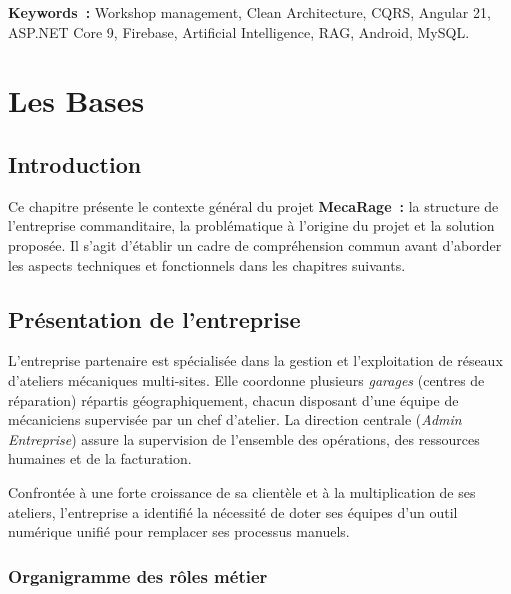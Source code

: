 \documentclass[12pt,a4paper]{report}
\begin{document}
\bigskip
\noindent\textbf{Keywords~:} Workshop management, Clean Architecture, CQRS,
Angular 21, ASP.NET Core 9, Firebase, Artificial Intelligence, RAG, Android, MySQL.

\tableofcontents
\listoffigures
\listoftables

\cleardoublepage
{}
\setcounter{page}{1}

\chapter{Les Bases}

\section{Introduction}

Ce chapitre présente le contexte général du projet \textbf{MecaRage~:} la structure
de l'entreprise commanditaire, la problématique à l'origine du projet et la solution
proposée. Il s'agit d'établir un cadre de compréhension commun avant d'aborder les
aspects techniques et fonctionnels dans les chapitres suivants.

\section{Présentation de l'entreprise}

L'entreprise partenaire est spécialisée dans la gestion et l'exploitation de réseaux
d'ateliers mécaniques multi-sites. Elle coordonne plusieurs \textit{garages}
(centres de réparation) répartis géographiquement, chacun disposant d'une équipe de
mécaniciens supervisée par un chef d'atelier. La direction centrale (\textit{Admin
Entreprise}) assure la supervision de l'ensemble des opérations, des ressources
humaines et de la facturation.

Confrontée à une forte croissance de sa clientèle et à la multiplication de ses
ateliers, l'entreprise a identifié la nécessité de doter ses équipes d'un outil
numérique unifié pour remplacer ses processus manuels.

\subsection*{Organigramme des rôles métier}
\end{document}
